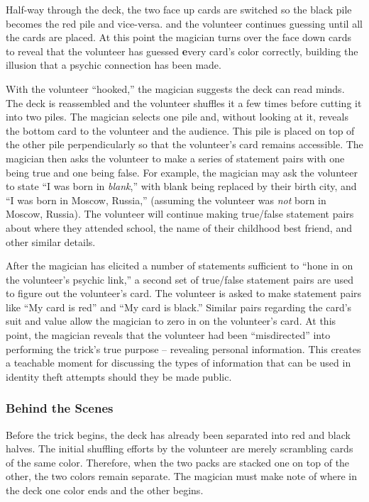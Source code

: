 Half-way through the deck,
the two face up cards are switched so the black pile becomes the red pile and vice-versa. and the volunteer continues guessing until all the cards are placed.
At this point the magician turns over the face
down cards to reveal that the volunteer has guessed {\textbf every}
card's color correctly, building the illusion that a psychic connection has been made.

With the volunteer ``hooked,'' the magician
suggests the deck can read minds.
The deck is reassembled
and the volunteer shuffles it
a few times before cutting it into two piles.
The magician
selects one pile and, without looking at it,
reveals the bottom card to the volunteer and the
audience.
This pile is placed on top of the other pile perpendicularly so that
the volunteer's card remains accessible.  The magician then asks the volunteer to
make a series of statement pairs with one being true and one being false.  For
example,  the magician may ask the volunteer to state  ``I was born in
\textit{blank},'' with blank being replaced by their birth city, and ``I was
born in Moscow, Russia,'' (assuming the volunteer was \textit{not} born in Moscow,
Russia).  The volunteer will continue making true/false
statement pairs about where they attended school, the name
of their childhood best friend, and other similar details. 

After the magician has elicited a number of statements sufficient to
``hone in on the volunteer's psychic link,''
a second set of true/false statement pairs are used
to figure out the volunteer's card.  The volunteer is asked to make
statement pairs like ``My card is red'' and ``My card is black.''  Similar
pairs regarding the card's suit and value allow the magician to zero
in on the volunteer's card.
At this point, the magician reveals that the volunteer had been
``misdirected'' into performing the trick's true purpose -- revealing
personal information.  This creates a teachable moment for discussing
the types of information that can be used in identity theft attempts
should they
be made public.

\subsubsection{Behind the Scenes}



Before the trick begins, the deck has already
been separated into red and black halves.
The initial shuffling efforts by the volunteer are merely scrambling
cards of the same color.
Therefore, when the two packs are
stacked one on top of the other, the two colors remain
separate.
The magician must make note of where in the deck
one color ends and the other begins.

